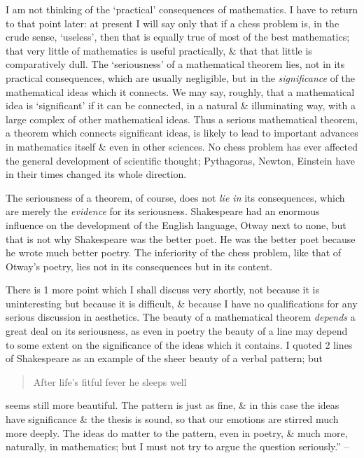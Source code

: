 \documentclass{article}
\numberwithin{equation}{section}
\begin{document}
I am not thinking of the `practical' consequences of mathematics. I have to return to that point later: at present I will say only that if a chess problem is, in the crude sense, `useless', then that is equally true of most of the best mathematics; that very little of mathematics is useful practically, \& that that little is comparatively dull. The `seriousness' of a mathematical theorem lies, not in its practical consequences, which are usually negligible, but in the \textit{significance} of the mathematical ideas which it connects. We may say, roughly, that a mathematical idea is `significant' if it can be connected, in a natural \& illuminating way, with a large complex of other mathematical ideas. Thus a serious mathematical theorem, a theorem which connects significant ideas, is likely to lead to important advances in mathematics itself \& even in other sciences. No chess problem has ever affected the general development of scientific thought; Pythagoras, Newton, Einstein have in their times changed its whole direction.

The seriousness of a theorem, of course, does not \textit{lie in} its consequences, which are merely the \textit{evidence} for its seriousness. Shakespeare had an enormous influence on the development of the English language, Otway next to none, but that is not why Shakespeare was the better poet. He was the better poet because he wrote much better poetry. The inferiority of the chess problem, like that of Otway's poetry, lies not in its consequences but in its content.

There is 1 more point which I shall discuss very shortly, not because it is uninteresting but because it is difficult, \& because I have no qualifications for any serious discussion in aesthetics. The beauty of a mathematical theorem \textit{depends} a great deal on its seriousness, as even in poetry the beauty of a line may depend to some extent on the significance of the ideas which it contains. I quoted 2 lines of Shakespeare as an example of the sheer beauty of a verbal pattern; but
\begin{quotation}
	After life's fitful fever he sleeps well
\end{quotation}
seems still more beautiful. The pattern is just as fine, \& in this case the ideas have significance \& the thesis is sound, so that our emotions are stirred much more deeply. The ideas do matter to the pattern, even in poetry, \& much more, naturally, in mathematics; but I must not try to argue the question seriously.'' -- \cite[pp. 88--91]{Hardy1992}
\end{document}
